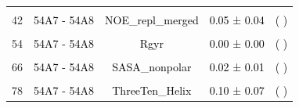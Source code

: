 \documentclass{article}\usepackage[table]{xcolor}
\renewcommand{\$}{$} %
\begin{document}
\begin{center}
\begin{longtable}[t]{lcccc}
\cellcolor{gray!6}{36} & \cellcolor{gray!6}{\textcolor{black}{54A7 - 54A8}} & \cellcolor{gray!6}{\textcolor{black}{Jvalue}} & \cellcolor{gray!6}{\textcolor{black}{0.02 ± 0.09}} & \cellcolor{gray!6}{\textcolor{black}{( )}}\\
42 & \textcolor{black}{54A7 - 54A8} & \textcolor{black}{NOE\_repl\_merged} & \textcolor{black}{0.05 ± 0.04} & \textcolor{black}{( )}\\
\cellcolor{gray!6}{48} & \cellcolor{gray!6}{\textcolor{black}{54A7 - 54A8}} & \cellcolor{gray!6}{\textcolor{black}{Pi\_Helix}} & \cellcolor{gray!6}{\textcolor{black}{0.04 ± 0.10}} & \cellcolor{gray!6}{\textcolor{black}{( )}}\\
54 & \textcolor{black}{54A7 - 54A8} & \textcolor{black}{Rgyr} & \textcolor{black}{0.00 ± 0.00} & \textcolor{black}{( )}\\
\cellcolor{gray!6}{60} & \cellcolor{gray!6}{\textcolor{black}{54A7 - 54A8}} & \cellcolor{gray!6}{\textcolor{black}{RMSD.ADJ}} & \cellcolor{gray!6}{\textcolor{black}{0.13 ± 0.07}} & \cellcolor{gray!6}{\textcolor{black}{( )}}\\
66 & \textcolor{black}{54A7 - 54A8} & \textcolor{black}{SASA\_nonpolar} & \textcolor{black}{0.02 ± 0.01} & \textcolor{black}{( )}\\
\cellcolor{gray!6}{72} & \cellcolor{gray!6}{\textcolor{black}{54A7 - 54A8}} & \cellcolor{gray!6}{\textcolor{black}{SASA\_polar}} & \cellcolor{gray!6}{\textcolor{black}{0.03 ± 0.01}} & \cellcolor{gray!6}{\textcolor{black}{( )}}\\
78 & \textcolor{black}{54A7 - 54A8} & \textcolor{black}{ThreeTen\_Helix} & \textcolor{black}{0.10 ± 0.07} & \textcolor{black}{( )}\\
\bottomrule
\end{longtable}


\end{center}
\end{document}
